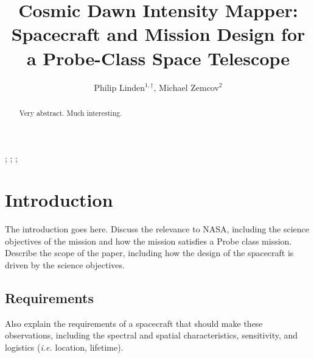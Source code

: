 \documentclass{ws-jai}
\begin{document}
\catchline{}{}{}{}{} %


\title{Cosmic Dawn Intensity Mapper: \\Spacecraft and Mission Design for a Probe-Class Space Telescope}

\author{Philip Linden$^{1,\dagger}$, Michael Zemcov$^{2}$}

\address{
$^1$Department of Mechanical Engineering, Kate Gleason College of Engineering, Rochester
Institute of Technology, Rochester, NY 14623, USA, pjl7651@rit.edu\\
$^1$Center for Detectors, School of Physics and Astronomy, Rochester
Institute of Technology, Rochester, NY 14623, USA, zemcov@cfd.rit.edu\\
}

\maketitle


\begin{history}
;
;
;
\end{history}

\begin{abstract}
  Very abstract.
  Much interesting.
\end{abstract}


\section{Introduction}
\label{S:introduction}
The introduction goes here.
%
Discuss the relevance to NASA, including the science objectives of the mission and how the mission satisfies a Probe class mission.
%
Describe the scope of the paper, including how the design of the spacecraft is driven by the science objectives.

\subsection{Requirements}
\label{sS:requirements}
Also explain the requirements of a spacecraft that should make these observations, including the spectral and spatial characteristics, sensitivity, and logistics (\textit{i.e.} location, lifetime).
\end{document}
